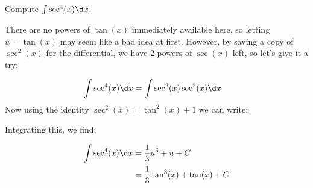 \documentclass{ximera}
\begin{document}
\begin{example}
Compute $\int \sec^{4}(x) \d x$. 

\begin{explanation}
 There are no powers of $\tan(x)$ immediately available here, so letting $u=\tan(x)$ may seem like a bad idea at first.  However, by saving a copy of $\sec^2(x)$ for the differential, we have $2$ powers of $\sec(x)$ left, so let's give it a try:
 
    \begin{align*}
    \int \sec^{4}(x) \d x  &= \int \sec^2(x) \sec^2(x) \d x
    \end{align*}
    Now using the identity $\sec^{2}(x)=\tan^{2}(x)+1$ we can write:
    \begin{center}%
    \end{center}
   
   Integrating this, we find:
   
   \begin{align*}
   \int \sec^{4}(x) \d x  &= \frac{1}{3}u^3+u +C\\
   &= \frac{1}{3} \tan^3(x)+\tan(x)+C
   \end{align*}
\end{explanation}
\end{example} 
\end{document}
